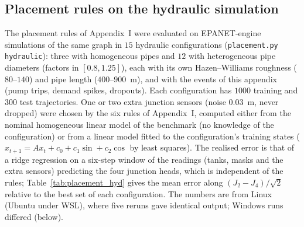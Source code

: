 \documentclass[conference]{IEEEtran}
\begin{document}
\begin{table}[t]
\centering
\caption{Estimators on the hydraulic simulation.}
\label{tab:hydraulic}
\small
\setlength{\tabcolsep}{3pt}
\end{table}



\subsection*{Placement rules on the hydraulic simulation}
The placement rules of Appendix~I were evaluated on EPANET-engine simulations of the same graph in $15$ hydraulic configurations (\texttt{placement.py hydraulic}): three with homogeneous pipes and $12$ with heterogeneous pipe diameters (factors in $[0.8,1.25]$), each with its own Hazen--Williams roughness ($80$--$140$) and pipe length ($400$--$900$~m), and with the events of this appendix (pump trips, demand spikes, dropouts). Each configuration has $1000$ training and $300$ test trajectories. One or two extra junction sensors (noise $0.03$~m, never dropped) were chosen by the six rules of Appendix~I, computed either from the nominal homogeneous linear model of the benchmark (no knowledge of the configuration) or from a linear model fitted to the configuration's training states ($x_{t+1}=Ax_t+c_0+c_1\sin+c_2\cos$ by least squares). The realised error is that of a ridge regression on a six-step window of the readings (tanks, masks and the extra sensors) predicting the four junction heads, which is independent of the rules; Table~\ref{tab:placement_hyd} gives the mean error along $(J_2-J_4)/\sqrt2$ relative to the best set of each configuration. The numbers are from Linux (Ubuntu under WSL), where five reruns gave identical output; Windows runs differed (below).
\end{document}
